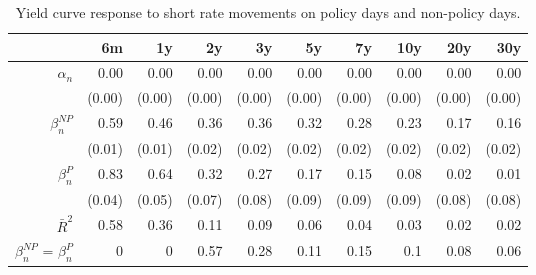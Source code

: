 \begin{table}[ht]
\centering
\caption{Yield curve response to short rate movements on policy days and non-policy days.} 
\label{tab:NPvsPdays}
\begin{tabular}{rrrrrrrrrr}
  \toprule
  & 6m & 1y & 2y & 3y & 5y & 7y & 10y & 20y & 30y \\ 
  \midrule
$\alpha_n$ & 0.00 & 0.00 & 0.00 & 0.00 & 0.00 & 0.00 & 0.00 & 0.00 & 0.00 \\ 
   & (0.00) & (0.00) & (0.00) & (0.00) & (0.00) & (0.00) & (0.00) & (0.00) & (0.00) \\ 
  $\beta_n^{NP}$ & 0.59 & 0.46 & 0.36 & 0.36 & 0.32 & 0.28 & 0.23 & 0.17 & 0.16 \\ 
   & (0.01) & (0.01) & (0.02) & (0.02) & (0.02) & (0.02) & (0.02) & (0.02) & (0.02) \\ 
  $\beta_n^P$ & 0.83 & 0.64 & 0.32 & 0.27 & 0.17 & 0.15 & 0.08 & 0.02 & 0.01 \\ 
   & (0.04) & (0.05) & (0.07) & (0.08) & (0.09) & (0.09) & (0.09) & (0.08) & (0.08) \\ 
  $\bar{R}^2$ & 0.58 & 0.36 & 0.11 & 0.09 & 0.06 & 0.04 & 0.03 & 0.02 & 0.02 \\ 
  $\beta_n^{NP}$ = $\beta_n^P$ & 0 & 0 & 0.57 & 0.28 & 0.11 & 0.15 & 0.1 & 0.08 & 0.06 \\ 
   \bottomrule
\end{tabular}
\end{table}
